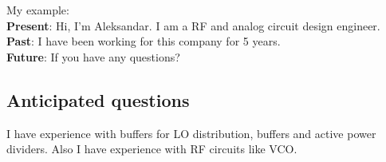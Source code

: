\documentclass{article}
\begin{document}
My example:\\
\textbf{Present}: Hi, I’m Aleksandar. I am a RF and analog circuit design engineer. \\
\textbf{Past}: I have been working for this company for 5 years.\\
\textbf{Future}: If you have any questions?

\subsection{Anticipated questions}

\begin{question}
	I have experience with buffers for LO distribution, buffers and active power dividers. 
	Also I have experience with RF circuits like VCO.
\end{question}



\end{document}

